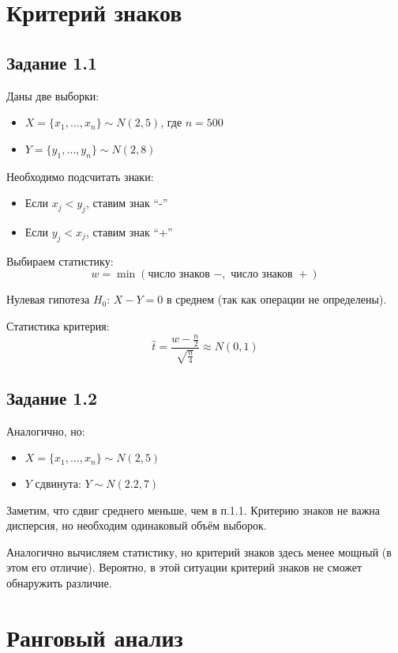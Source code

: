 \documentclass{article}
\begin{document}
\section{Критерий знаков}

\subsection{Задание 1.1}

Даны две выборки:
\begin{itemize}
    \item $X = \{x_1, \dots, x_n\} \sim N(2, 5)$, где $n = 500$
    \item $Y = \{y_1, \dots, y_n\} \sim N(2, 8)$
\end{itemize}

Необходимо подсчитать знаки:
\begin{itemize}
    \item Если $x_j < y_j$, ставим знак ``-''
    \item Если $y_j < x_j$, ставим знак ``+''
\end{itemize}

Выбираем статистику:
\[ w = \min(\text{число знаков } -, \text{ число знаков } +) \]

Нулевая гипотеза $H_0$: $X - Y = 0$ в среднем (так как операции не определены).

Статистика критерия:
\[ \hat{t} = \frac{w - \frac{n}{2}}{\sqrt{\frac{n}{4}}} \approx N(0, 1) \]

\subsection{Задание 1.2}

Аналогично, но:
\begin{itemize}
    \item $X = \{x_1, \dots, x_n\} \sim N(2, 5)$
    \item $Y$ сдвинута: $Y \sim N(2.2, 7)$
\end{itemize}

Заметим, что сдвиг среднего меньше, чем в п.1.1. Критерию знаков не важна дисперсия, но необходим одинаковый объём выборок.

Аналогично вычисляем статистику, но критерий знаков здесь менее мощный (в этом его отличие). Вероятно, в этой ситуации критерий знаков не сможет обнаружить различие.

\section{Ранговый анализ}
\end{document}
